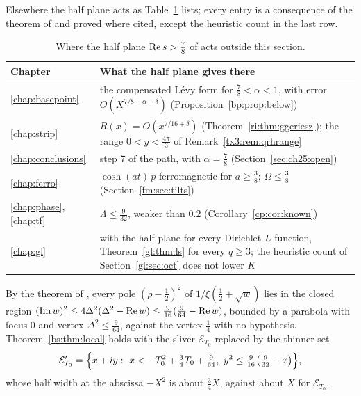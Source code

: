 Elsewhere the half plane acts as Table~\ref{tx5:tab:map} lists; every entry is a consequence of the theorem of \cite{OAI26a} and proved where cited, except the heuristic count in the last row.

\begin{table}[t]\centering\small
\begin{tabular}{@{}lp{}@{}}\toprule
Chapter & What the half plane gives there\\\midrule
\ref{chap:basepoint} & the compensated L\'evy form for $\frac78<\alpha<1$, with error $O(X^{7/8-\alpha+\delta})$ (Proposition~\ref{bp:prop:below})\\
\ref{chap:strip} & $R(x)=O(x^{7/16+\delta})$ (Theorem~\ref{ri:thm:ggcriesz}); the range $0<y<\frac{4\pi}3$ of Remark~\ref{tx3:rem:qrhrange}\\
\ref{chap:conclusions} & step 7 of the path, with $\alpha=\frac78$ (Section~\ref{sec:ch25:open})\\
\ref{chap:ferro} & $\cosh(at)\,p$ ferromagnetic for $a\ge\frac38$; $\Omega\le\frac38$ (Section~\ref{fm:sec:tilts})\\
\ref{chap:phase}, \ref{chap:tf} & $\Lambda\le\frac9{32}$, weaker than $0.2$ (Corollary~\ref{cp:cor:known})\\
\ref{chap:gl} & with the half plane for every Dirichlet $L$ function, Theorem~\ref{gl:thm:ls} for every $q\ge3$; the heuristic count of Section~\ref{gl:sec:oct} does not lower $K$\\
\bottomrule\end{tabular}
\caption{Where the half plane $\operatorname{Re} s>\frac78$ of \cite{OAI26a} acts outside this section.}\label{tx5:tab:map}
\end{table}

\begin{proposition}\label{tx5:prop:sliver}
By the theorem of \cite{OAI26a}, every pole $(\rho-\frac12)^2$ of $1/\xi(\frac12+\sqrt w)$ lies in the closed region $(\operatorname{Im} w)^2\le4\Delta^2(\Delta^2-\operatorname{Re} w)\le\frac9{16}(\frac9{64}-\operatorname{Re} w)$, bounded by a parabola with focus $0$ and vertex $\Delta^2\le\frac9{64}$, against the vertex $\frac14$ with no hypothesis. Theorem~\ref{bs:thm:local} holds with the sliver $\mathcal E_{T_0}$ replaced by the thinner set
\[
\mathcal E'_{T_0}=\Bigl\{x+iy:\ x<-T_0^2+\tfrac34T_0+\tfrac9{64},\ y^2\le\tfrac9{16}\bigl(\tfrac9{32}-x\bigr)\Bigr\},
\]
whose half width at the abscissa $-X^2$ is about $\frac34X$, against about $X$ for $\mathcal E_{T_0}$.
\end{proposition}


